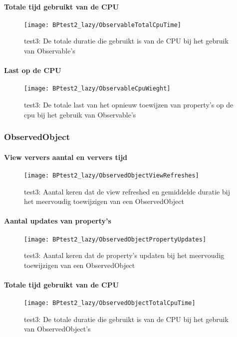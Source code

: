 \paragraph{Totale tijd gebruikt van de CPU}
\begin{figure}[H]
    \centering
    \texttt{[image: BPtest2\_lazy/ObservableTotalCpuTime]} 
    \caption{test3: De totale duratie die gebruikt is van de CPU bij het gebruik van Observable's}
    \label{fig:cpuUsageTimeObservable2}
\end{figure}
\paragraph{Last op de CPU}
\begin{figure}[H]
    \centering
    \texttt{[image: BPtest2\_lazy/ObservableCpuWieght]} 
    \caption{test3: De totale last van het opnieuw toewijzen van property's op de cpu bij het gebruik van Observable's}
    \label{fig:cpuWeightObservable2}
\end{figure}

\subsubsection{ObservedObject}
\paragraph{View ververs aantal en ververs tijd}
\begin{figure}[H]
    \centering
    \texttt{[image: BPtest2\_lazy/ObservedObjectViewRefreshes]} 
    \caption{test3: Aantal keren dat de view refreshed en gemiddelde duratie bij het meervoudig toewijzigen van een ObservedObject}
    \label{fig:viewRefreshesObservedObject2}
\end{figure}
\paragraph{Aantal updates van property's}
\begin{figure}[H]
    \centering
    \texttt{[image: BPtest2\_lazy/ObservedObjectPropertyUpdates]} 
    \caption{test3: Aantal keren dat de property's updaten bij het meervoudig toewijzigen van een ObservedObject}
    \label{fig:propertyUpdatesObservedObject2}
\end{figure}
\paragraph{Totale tijd gebruikt van de CPU}
\begin{figure}[H]
    \centering
    \texttt{[image: BPtest2\_lazy/ObservedObjectTotalCpuTime]} 
    \caption{test3: De totale duratie die gebruikt is van de CPU bij het gebruik van ObservedObject's}
    \label{fig:cpuUsageTimeObservedObject2}
\end{figure}
